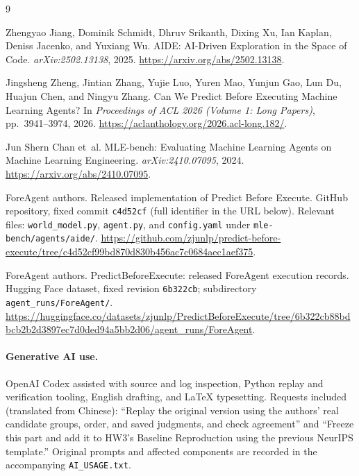 \documentclass{article}
\begin{document}
\clearpage
\begin{thebibliography}{9}

Zhengyao Jiang, Dominik Schmidt, Dhruv Srikanth, Dixing Xu, Ian Kaplan, Deniss Jacenko, and Yuxiang Wu.
\newblock AIDE: AI-Driven Exploration in the Space of Code.
\newblock \emph{arXiv:2502.13138}, 2025.
\newblock \url{https://arxiv.org/abs/2502.13138}.

Jingsheng Zheng, Jintian Zhang, Yujie Luo, Yuren Mao, Yunjun Gao, Lun Du, Huajun Chen, and Ningyu Zhang.
\newblock Can We Predict Before Executing Machine Learning Agents?
\newblock In \emph{Proceedings of ACL 2026 (Volume 1: Long Papers)}, pp.\ 3941--3974, 2026.
\newblock \url{https://aclanthology.org/2026.acl-long.182/}.

Jun Shern Chan et~al.
\newblock MLE-bench: Evaluating Machine Learning Agents on Machine Learning Engineering.
\newblock \emph{arXiv:2410.07095}, 2024.
\newblock \url{https://arxiv.org/abs/2410.07095}.

ForeAgent authors.
\newblock Released implementation of Predict Before Execute.
\newblock GitHub repository, fixed commit \texttt{c4d52cf} (full identifier in the URL below).
\newblock Relevant files: \texttt{world\_model.py}, \texttt{agent.py}, and \texttt{config.yaml} under \texttt{mle-bench/agents/aide/}.
\newblock \url{https://github.com/zjunlp/predict-before-execute/tree/c4d52cf99bd870d830b456ac7c0684aec1aef375}.


ForeAgent authors.
\newblock PredictBeforeExecute: released ForeAgent execution records.
\newblock Hugging Face dataset, fixed revision \texttt{6b322cb}; subdirectory \texttt{agent\_runs/ForeAgent/}.
\newblock \url{https://huggingface.co/datasets/zjunlp/PredictBeforeExecute/tree/6b322cb88bdbcb2b2d3897ec7d0ded94a5bb2d06/agent_runs/ForeAgent}.

\end{thebibliography}

\paragraph{Generative AI use.}
OpenAI Codex assisted with source and log inspection, Python replay and verification tooling, English drafting, and LaTeX typesetting. Requests included (translated from Chinese): ``Replay the original version using the authors' real candidate groups, order, and saved judgments, and check agreement'' and ``Freeze this part and add it to HW3's Baseline Reproduction using the previous NeurIPS template.'' Original prompts and affected components are recorded in the accompanying \texttt{AI\_USAGE.txt}.
\end{document}
